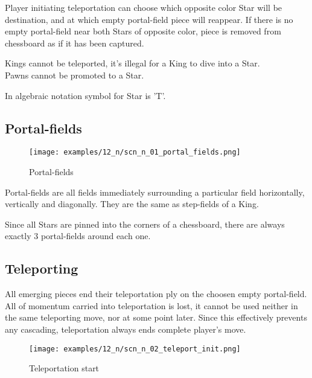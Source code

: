 Player initiating teleportation can choose which opposite color Star will be destination,
and at which empty portal-field piece will reappear. If there is no empty portal-field near
both Stars of opposite color, piece is removed from chessboard as if it has been captured.

Kings cannot be teleported, it's illegal for a King to dive into a Star. \\
Pawns cannot be promoted to a Star.

In algebraic notation symbol for Star is 'T'.

\clearpage %

\subsection*{Portal-fields}

\noindent
\begin{wrapfigure}{l}{0.5\textwidth}
\centering
\texttt{[image: examples/12\_n/scn\_n\_01\_portal\_fields.png]}
\caption{Portal-fields}
\label{fig:scn_n_01_portal_fields}
\end{wrapfigure}
Portal-fields are all fields immediately surrounding a particular field
horizontally, vertically and diagonally. They are the same as step-fields
of a King.

Since all Stars are pinned into the corners of a chessboard, there are always
exactly 3 portal-fields around each one.

\subsection*{Teleporting}

All emerging pieces end their teleportation ply on the choosen empty
portal-field. All of momentum carried into teleportation is lost, it cannot
be used neither in the same teleporting move, nor at some point later.
Since this effectively prevents any cascading, teleportation always ends
complete player's move.

\clearpage %

\noindent
\begin{figure}[!h]
\texttt{[image: examples/12\_n/scn\_n\_02\_teleport\_init.png]}
\caption{Teleportation start}
\label{fig:scn_n_02_teleport_init}
\end{figure}

